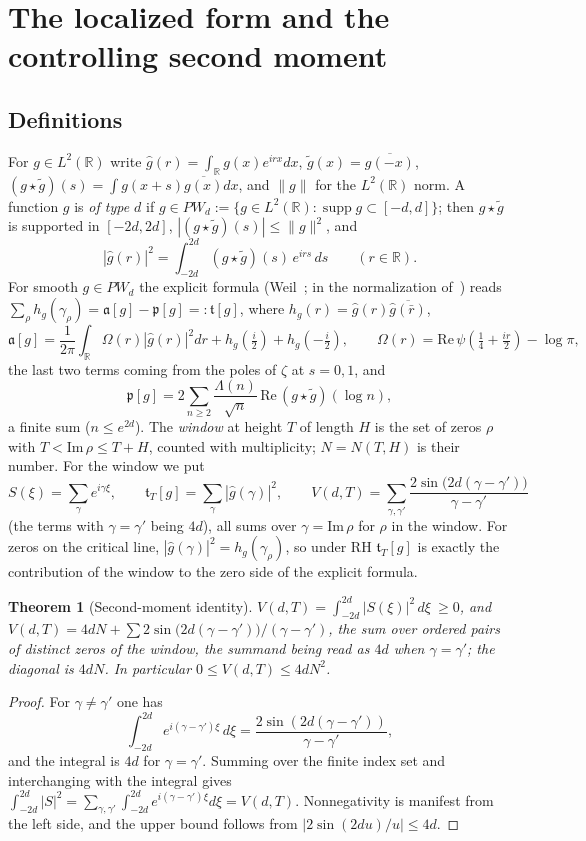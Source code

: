 \documentclass[11pt]{amsart}
\newtheorem{theorem}{Theorem}[section]
\theoremstyle{definition}
\theoremstyle{remark}
\newcommand{\fa}{\mathfrak a}
\newcommand{\fp}{\mathfrak p}
\newcommand{\ft}{\mathfrak t}
\newcommand{\bbR}{\mathbb{R}}
\begin{document}
\section{The localized form and the controlling second moment}
\subsection*{Definitions}
For $g\in L^2(\bbR)$ write $\widehat g(r)=\int_\bbR g(x)e^{irx}dx$,
$\tilde g(x)=\overline{g(-x)}$, $(g\star\tilde g)(s)=\int g(x+s)\overline{g(x)}dx$,
and $\|g\|$ for the $L^2(\bbR)$ norm. A function $g$ is \emph{of type $d$} if
$g\in PW_d:=\{g\in L^2(\bbR):\operatorname{supp}g\subset[-d,d]\}$; then
$g\star\tilde g$ is supported in $[-2d,2d]$, $|(g\star\tilde g)(s)|\le\|g\|^2$,
and
\begin{equation*}
|\widehat g(r)|^2=\int_{-2d}^{2d}(g\star\tilde g)(s)\,e^{irs}\,ds\qquad(r\in\bbR).
\end{equation*}
For smooth $g\in PW_d$ the explicit formula (Weil~\cite{Weil}; in the normalization
of~\cite[\S2]{RP16}) reads $\sum_\rho h_g(\gamma_\rho)=\fa[g]-\fp[g]=:\ft[g]$, where
$h_g(r)=\widehat g(r)\overline{\widehat g(\bar r)}$,
\[
\fa[g]=\frac1{2\pi}\int_\bbR\Omega(r)|\widehat g(r)|^2dr+h_g(\tfrac i2)+h_g(-\tfrac i2),
\qquad \Omega(r)=\mathrm{Re}\,\psi(\tfrac14+\tfrac{ir}2)-\log\pi,
\]
the last two terms coming from the poles of $\zeta$ at $s=0,1$, and
\[
\fp[g]=2\sum_{n\ge2}\frac{\Lambda(n)}{\sqrt n}\,\mathrm{Re}\,(g\star\tilde g)(\log n),
\]
a finite sum ($n\le e^{2d}$). The \emph{window} at height $T$ of length $H$ is
the set of zeros $\rho$ with $T<\mathrm{Im}\,\rho\le T+H$, counted with
multiplicity; $N=N(T,H)$ is their number. For the window we put
\[
S(\xi)=\sum_{\gamma}e^{i\gamma\xi},\qquad
\ft_T[g]=\sum_{\gamma}|\widehat g(\gamma)|^2,\qquad
V(d,T)=\sum_{\gamma,\gamma'}\frac{2\sin\!\bigl(2d(\gamma-\gamma')\bigr)}{\gamma-\gamma'}
\]
(the terms with $\gamma=\gamma'$ being $4d$), all sums over $\gamma=\mathrm{Im}\,\rho$
for $\rho$ in the window. For zeros on the critical line,
$|\widehat g(\gamma)|^2=h_g(\gamma_\rho)$, so under RH $\ft_T[g]$ is exactly the
contribution of the window to the zero side of the explicit formula.

\begin{theorem}[Second-moment identity]\label{thm:id}
$\displaystyle V(d,T)=\int_{-2d}^{2d}|S(\xi)|^2\,d\xi\ \ge 0$, and
$V(d,T)=4dN+\sum 2\sin\!\bigl(2d(\gamma-\gamma')\bigr)/(\gamma-\gamma')$,
the sum over ordered pairs of distinct zeros of the window, the summand being
read as $4d$ when $\gamma=\gamma'$; the diagonal is $4dN$. In particular $0\le V(d,T)\le4dN^2$.
\end{theorem}
\begin{proof}
For $\gamma\ne\gamma'$ one has
\[
\int_{-2d}^{2d}e^{i(\gamma-\gamma')\xi}\,d\xi=\frac{2\sin(2d(\gamma-\gamma'))}{\gamma-\gamma'},
\]
and the integral is $4d$ for $\gamma=\gamma'$. Summing
over the finite index set and interchanging with the integral
gives $\int_{-2d}^{2d}|S|^2=\sum_{\gamma,\gamma'}\int_{-2d}^{2d}
e^{i(\gamma-\gamma')\xi}d\xi=V(d,T)$. Nonnegativity is manifest from the
left side, and the upper bound follows from $|2\sin(2du)/u|\le4d$.
\end{proof}
\end{document}
